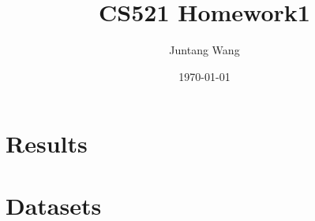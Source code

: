 \documentclass[12pt]{article} %
\title{CS521 Homework1} %
\author{Juntang Wang}        %
\date{\today}             %
\begin{document}
\section{Results}

\section{Datasets}





\end{document}
